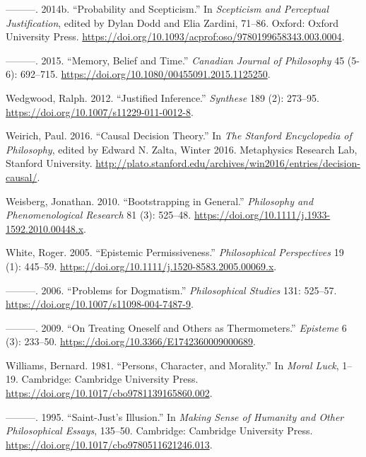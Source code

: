 \documentclass[
  10pt,
  letterpaper,
  twoside]{scrbook}
\newlength{\cslhangindent}
\newenvironment{CSLReferences}[2] %
 {\begin{list}{}{%
  \setlength{\itemindent}{0pt}
  \setlength{\leftmargin}{0pt}
  \setlength{\parsep}{0pt}
  \ifodd #1
   \setlength{\leftmargin}{\cslhangindent}
   \setlength{\itemindent}{-1\cslhangindent}
  \fi
  \setlength{\itemsep}{#2\baselineskip}}}
 {\end{list}}
\begin{document}
\begin{CSLReferences}{1}{0}
---------. 2014b. {``Probability and Scepticism.''} In \emph{Scepticism
and Perceptual Justification}, edited by Dylan Dodd and Elia Zardini,
71--86. Oxford: Oxford University Press.
\url{https://doi.org/10.1093/acprof:oso/9780199658343.003.0004}.

---------. 2015. {``Memory, Belief and Time.''} \emph{Canadian Journal
of Philosophy} 45 (5-6): 692--715.
\url{https://doi.org/10.1080/00455091.2015.1125250}.

Wedgwood, Ralph. 2012. {``Justified Inference.''} \emph{Synthese} 189
(2): 273--95. \url{https://doi.org/10.1007/s11229-011-0012-8}.

Weirich, Paul. 2016. {``Causal Decision Theory.''} In \emph{The Stanford
Encyclopedia of Philosophy}, edited by Edward N. Zalta, Winter 2016.
Metaphysics Research Lab, Stanford University.
\url{http://plato.stanford.edu/archives/win2016/entries/decision-causal/}.

Weisberg, Jonathan. 2010. {``Bootstrapping in General.''}
\emph{Philosophy and Phenomenological Research} 81 (3): 525--48.
\url{https://doi.org/10.1111/j.1933-1592.2010.00448.x}.

White, Roger. 2005. {``Epistemic Permissiveness.''} \emph{Philosophical
Perspectives} 19 (1): 445--59.
\url{https://doi.org/10.1111/j.1520-8583.2005.00069.x}.

---------. 2006. {``Problems for Dogmatism.''} \emph{Philosophical
Studies} 131: 525--57. \url{https://doi.org/10.1007/s11098-004-7487-9}.

---------. 2009. {``On Treating Oneself and Others as Thermometers.''}
\emph{Episteme} 6 (3): 233--50.
\url{https://doi.org/10.3366/E1742360009000689}.

Williams, Bernard. 1981. {``Persons, Character, and Morality.''} In
\emph{Moral Luck}, 1--19. Cambridge: Cambridge University Press.
\url{https://doi.org/10.1017/cbo9781139165860.002}.

---------. 1995. {``Saint-Just's Illusion.''} In \emph{Making Sense of
Humanity and Other Philosophical Essays}, 135--50. Cambridge:
{C}ambridge {U}niversity {P}ress.
\url{https://doi.org/10.1017/cbo9780511621246.013}.


\end{CSLReferences}
\end{document}
